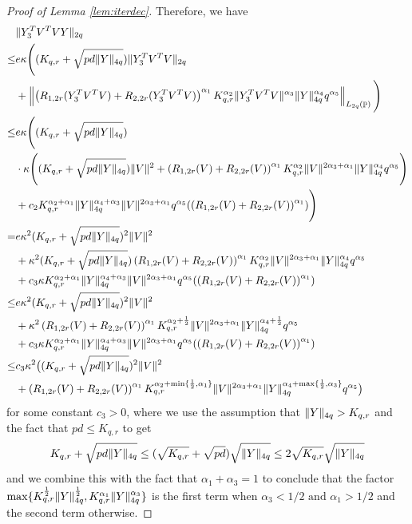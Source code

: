 \documentclass[10pt,a4paper]{amsart}
\DeclareMathOperator{\Pb}{\mathbb{P}}
\DeclarePairedDelimiter{\norm}{\lVert}{\rVert}
\newcommand{\norml}[1]{\left\lVert#1\right\rVert}
\begin{document}
\begin{proof}[Proof of Lemma \ref{lem:iterdec}]
Therefore, we have
    \begin{align*}
    &\norm{Y_3^TV^TVY}_{2q} \\\le& e\kappa \Bigg((K_{q,r}+\sqrt{pd\norm{Y}_{4q}})\norm{Y_3^TV^TV}_{2q} \\&+ \norml{\left(R_{1,2r}(Y_3^TV^TV)+R_{2,2r}(Y_3^TV^TV)\right)^{\alpha_1}K_{q,r}^{\alpha_2}\norm{Y_3^TV^TV}^{\alpha_3} \norm{Y}_{4q} ^{\alpha_4}q^{\alpha_5}}_{L_{2q}(\Pb)}\Bigg)
    \\ \le & e\kappa \Bigg((K_{q,r}+\sqrt{pd\norm{Y}_{4q}}) \\& \cdot \kappa \Bigg((K_{q,r}+\sqrt{pd\norm{Y}_{4q}})\norm{V}^2 + \left(R_{1,2r}(V)+R_{2,2r}(V)\right)^{\alpha_1}K_{q,r}^{\alpha_2}\norm{V}^{2\alpha_3+\alpha_1} \norm{Y}_{4q}^{\alpha_4}q^{\alpha_5}\Bigg) \\&+ c_2 K_{q,r}^{\alpha_2+\alpha_1}\norm{Y}_{4q}^{\alpha_4+\alpha_3}\norm{V}^{2 \alpha_3+\alpha_1}q^{\alpha_5}(\left(R_{1,2r}(V)+R_{2,2r}(V)\right)^{\alpha_1})\Bigg)
    \\ = & e\kappa^2 (K_{q,r}+\sqrt{pd\norm{Y}_{4q}})^2 \norm{V}^2 \\&+ \kappa^2 (K_{q,r}+\sqrt{pd\norm{Y}_{4q}})\left(R_{1,2r}(V)+R_{2,2r}(V)\right)^{\alpha_1}K_{q,r}^{\alpha_2}\norm{V}^{2\alpha_3+\alpha_1} \norm{Y}_{4q}^{\alpha_4}q^{\alpha_5} \\& + c_3 \kappa K_{q,r}^{\alpha_2+\alpha_1}\norm{Y}_{4q}^{\alpha_4+\alpha_3}\norm{V}^{2 \alpha_3+\alpha_1}q^{\alpha_5}(\left(R_{1,2r}(V)+R_{2,2r}(V)\right)^{\alpha_1})
\\ \le  & e\kappa^2 (K_{q,r}+\sqrt{pd\norm{Y}_{4q}})^2 \norm{V}^2 \\&+ \kappa^2 \left(R_{1,2r}(V)+R_{2,2r}(V)\right)^{\alpha_1}K_{q,r}^{\alpha_2+\frac{1}{2}}\norm{V}^{2\alpha_3+\alpha_1} \norm{Y}_{4q}^{\alpha_4+\frac{1}{2}}q^{\alpha_5} \\& + c_3 \kappa K_{q,r}^{\alpha_2+\alpha_1}\norm{Y}_{4q}^{\alpha_4+\alpha_3}\norm{V}^{2 \alpha_3+\alpha_1}q^{\alpha_5}(\left(R_{1,2r}(V)+R_{2,2r}(V)\right)^{\alpha_1})
\\ \le  & c_3\kappa^2 \big((K_{q,r}+\sqrt{pd\norm{Y}_{4q}})^2 \norm{V}^2 \\&+ \left(R_{1,2r}(V)+R_{2,2r}(V)\right)^{\alpha_1}K_{q,r}^{\alpha_2+\min\{\frac{1}{2},\alpha_1\}}\norm{V}^{2\alpha_3+\alpha_1} \norm{Y}_{4q}^{\alpha_4+\max\{\frac{1}{2},\alpha_3\}}q^{\alpha_5} \big)
\end{align*}
for some constant $c_3>0$,
where we use the assumption that $\norm{Y}_{4q}>K_{q,r}$ and the fact that $pd \le K_{q,r}$ to get
\begin{align*}
    K_{q,r}+\sqrt{pd\norm{Y}_{4q}} \le (\sqrt{K_{q,r}} + \sqrt{pd})\sqrt{\norm{Y}_{4q}} \le 2 \sqrt{K_{q,r}}\sqrt{\norm{Y}_{4q}}
\end{align*}
and we combine this with the fact that $\alpha_1+\alpha_3=1$ to conclude that the factor $\max \{ K_{q,r}^{\frac{1}{2}} \norm{Y}_{4q}^{\frac{1}{2}}, K_{q,r}^{\alpha_1} \norm{Y}_{4q}^{\alpha_3} \}$
is the first term when $\alpha_3<1/2 \text{ and } \alpha_1 >1/2$ and the second term otherwise. 



\end{proof}
\end{document}
